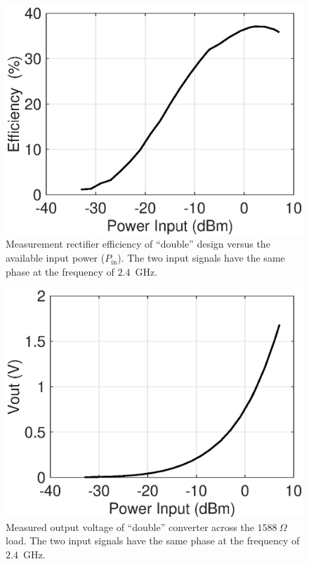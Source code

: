\documentclass[journal]{IEEEtran}
\begin{document}
\begin{figure}[t]
\centering
\includegraphics[width=0.9\columnwidth]{Figures/Fig6.eps}
\caption{Measurement rectifier efficiency of ``double'' design versus the available input power ($P_\text{in}$). The two input signals have the same phase at the frequency of $2.4$~GHz.}
\label{fig:eff_vs_pin}
\end{figure}
%
\begin{figure}[t]
\centering
\includegraphics[width=0.9\columnwidth]{Figures/Fig7.eps}
\caption{Measured  output  voltage of ``double'' converter across the $1588~\Omega$ load.
The two input signals have the same phase at the frequency of $2.4$~GHz.}
\label{fig:vout_vs_pin}
\end{figure}
%
%
\end{document}
